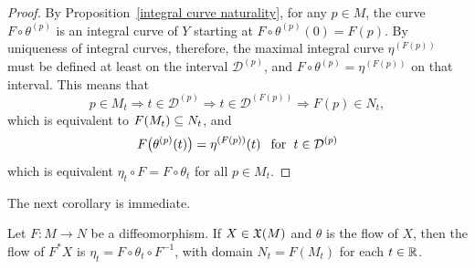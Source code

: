 \begin{proof}
By Proposition~\ref{integral curve naturality}, for any $p\in M$, the curve $F\circ\theta^{(p)}$ is an integral curve of $Y$ starting at $F\circ\theta^{(p)}(0)=F(p)$. By uniqueness of integral curves, therefore, the maximal integral curve $\eta^{(F(p))}$ must be defined at least on the interval $\mathcal{D}^{(p)}$, and $F\circ\theta^{(p)}=\eta^{(F(p))}$ on that interval. This means that
\[p\in M_t\Rightarrow t\in\mathcal{D}^{(p)}\Rightarrow t\in\mathcal{D}^{(F(p))}\Rightarrow F(p)\in N_t,\]
which is equivalent to $F(M_t)\subseteq N_t$, and
\[F\big(\theta^{(p)}(t)\big)=\eta^{(F(p))}(t)\hspace{8pt}\text{for}\hspace{6pt} t\in\mathcal{D}^{(p)}\]
which is equivalent $\eta_t\circ F=F\circ\theta_t$ for all $p\in M_t$.
\end{proof}
The next corollary is immediate.
\begin{corollary}
Let $F:M\to N$ be a diffeomorphism. If $X\in\mathfrak{X}(M)$ and $\theta$ is the flow of $X$, then the flow of $F^*X$ is $\eta_t=F\circ\theta_t\circ F^{-1}$, with domain $N_t=F(M_t)$ for each $t\in\mathbb{R}$.
\end{corollary}
